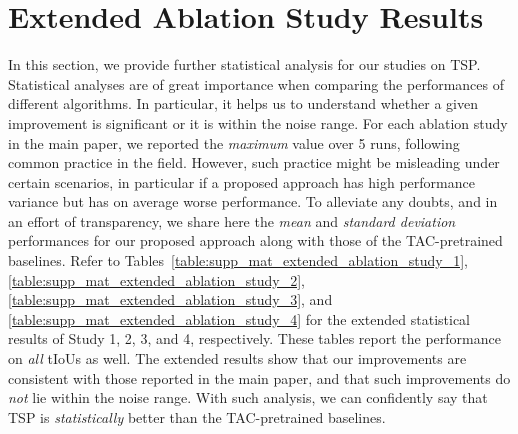 \documentclass[10pt,twocolumn,letterpaper]{article}
\begin{document}
\section{Extended Ablation Study Results}
In this section, we provide further statistical analysis for our studies on TSP. Statistical analyses are of great importance when comparing the performances of different algorithms. In particular, it helps us to understand whether a given improvement is significant or it is within the noise range. For each ablation study in the main paper, we reported the \textit{maximum} value over 5 runs, following common practice in the field. However, such practice might be misleading under certain scenarios, in particular if a proposed approach has high performance variance but has on average worse performance. To alleviate any doubts, and in an effort of transparency, we share here the \textit{mean} and \textit{standard deviation} performances for our proposed approach along with those of the TAC-pretrained baselines. Refer to Tables~\ref{table:supp_mat_extended_ablation_study_1}, \ref{table:supp_mat_extended_ablation_study_2}, \ref{table:supp_mat_extended_ablation_study_3}, and \ref{table:supp_mat_extended_ablation_study_4} for the extended statistical results of Study 1, 2, 3, and 4, respectively. These tables report the performance on \textit{all} tIoUs as well. The extended results show that our improvements are consistent with those reported in the main paper, and that such improvements do \textit{not} lie within the noise range. With such analysis, we can confidently say that TSP is \textit{statistically} better than the TAC-pretrained baselines.
\end{document}
